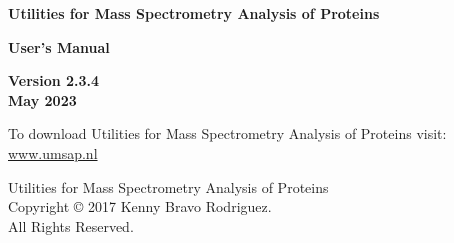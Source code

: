 \clearpage
\thispagestyle{empty}
\begin{center}
{\Huge\textbf{Utilities for Mass Spectrometry Analysis of Proteins}}

\vspace{60pt}

{\huge \textbf{User's Manual}}

\vspace{70pt}

{\Large \textbf{Version \num[parse-numbers=false, detect-weight]{2.3.4} \\
\vspace{10pt} May \num[detect-weight]{2023}}}

\vspace{140pt}

To download Utilities for Mass Spectrometry Analysis of Proteins visit: \\
\href{https://www.umsap.nl}{www.umsap.nl}

\vspace*{\fill}
Utilities for Mass Spectrometry Analysis of Proteins \\
Copyright © \num[detect-weight]{2017} Kenny Bravo Rodriguez. \\All Rights Reserved.

\end{center}

\newpage
\thispagestyle{empty}
 \label{sec:tableofcontent}
\tableofcontents

\newpage
\thispagestyle{empty}
 \label{sec:listoffig}
\listoffigures

\newpage
\thispagestyle{empty}
 \label{sec:listoftables}
\listoftables